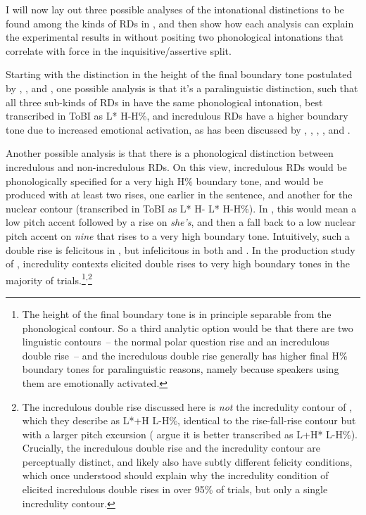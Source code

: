 \documentclass[output=paper,colorlinks,citecolor=brown]{langscibook}
\begin{document}
	I will now lay out three possible analyses of the intonational distinctions to be found among the kinds of RDs in , and then show how each analysis can explain the experimental results in \citet{jeong18} without positing two phonological intonations that correlate with force in the inquisitive/assertive split.
	
	Starting with the distinction in the height of the final boundary tone postulated by \citet{jeong18}, \citet{rudin18}, and \citet{westera18}, one possible analysis is that it's a paralinguistic distinction, such that all three sub-kinds of RDs in  have the same phonological intonation, best transcribed in ToBI as L* H-H\%, and incredulous RDs have a higher boundary tone due to increased emotional activation, as has been discussed by \citet{gussenhoven04}, \citet{banziger05}, \citet{cresposendra13}, \citet{westera17}, and \citet{goodhue21:lsa}. 
	
	Another possible analysis is that there is a phonological distinction between incredulous and non-incredulous RDs. On this view, incredulous RDs would be phonologically specified for a very high H\% boundary tone, and would be produced with at least two rises, one earlier in the sentence, and another for the nuclear contour (transcribed in ToBI as L* H- L* H-H\%). In , this would mean a low pitch accent followed by a rise on \emph{she's}, and then a fall back to a low nuclear pitch accent on \emph{nine} that rises to a very high boundary tone. Intuitively, such a double rise is felicitous in , but infelicitous in both  and . In the production study of \citet{goodhue16:best}, incredulity contexts elicited double rises to very high boundary tones in the majority of trials.\footnote{The height of the final boundary tone is in principle separable from the phonological contour. So a third analytic option would be that there are two linguistic contours~-- the normal polar question rise and an incredulous double rise~-- and the incredulous double rise generally has higher final H\% boundary tones for paralinguistic reasons, namely because speakers using them are emotionally activated.}\textsuperscript{,}\footnote{The incredulous double rise discussed here is \emph{not} the incredulity contour of \citet{hirschberg92}, which they describe as L*+H L-H\%, identical to the rise-fall-rise contour but with a larger pitch excursion (\citealt{barnes12} argue it is better transcribed as L+H* L-H\%). Crucially, the incredulous double rise and the incredulity contour are perceptually distinct, and likely also have subtly different felicity conditions, which once understood should explain why the incredulity condition of \citet{goodhue16:best} elicited incredulous double rises in over 95\% of trials, but only a single incredulity contour.}
	
\end{document}
